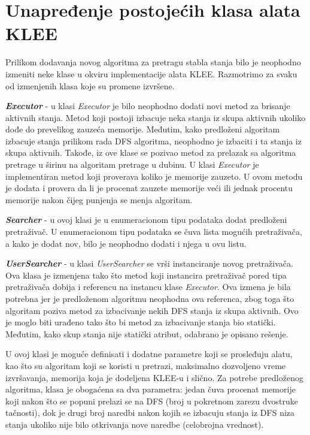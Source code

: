 \documentclass[12pt,oneside]{memoir}
\begin{document}
\section{Unapređenje postojećih klasa alata KLEE} \label{izmene}
Prilikom dodavanja novog algoritma za pretragu stabla stanja bilo je neophodno izmeniti neke klase u okviru implementacije alata KLEE. Razmotrimo za svaku od izmenjenih klasa koje su promene izvršene.

\begin{description}
    \item \textbf{\textit{Executor}} - u klasi \textit{Executor} je bilo neophodno dodati novi metod za brisanje aktivnih stanja. Metod koji postoji izbacuje neka stanja iz skupa aktivnih ukoliko dođe do prevelikog zauzeća memorije. Međutim, kako predloženi algoritam izbacuje stanja prilikom rada DFS algoritma, neophodno je izbaciti i ta stanja iz skupa aktivnih. Takođe, iz ove klase se pozivao metod za prelazak sa algoritma pretrage u širinu na algoritam pretrage u dubinu. U klasi \textit{Executor} je implementiran metod koji proverava koliko je memorije zauzeto. U ovom metodu je dodata i provera da li je procenat zauzete memorije veći ili jednak procentu memorije nakon čijeg punjenja se menja algoritam.
    
    \item \textbf{\textit{Searcher}} - u ovoj klasi je u enumeracionom tipu podataka dodat predloženi pretraživač. U enumeracionom tipu podataka se čuva lista mogućih pretraživača, a kako je dodat nov, bilo je neophodno dodati i njega u ovu listu.
    
    \item \textbf{\textit{UserSearcher}} \label{userSearcher} - u klasi \textit{UserSearcher} se vrši instanciranje novog pretraživača. Ova klasa je izmenjena tako što metod koji instancira pretraživač pored tipa pretraživača dobija i referencu na instancu klase \textit{Executor}. Ova izmena je bila potrebna jer je predloženom algoritmu neophodna ova referenca, zbog toga što algoritam poziva metod za izbacivanje nekih DFS stanja iz skupa aktivnih. Ovo je moglo biti urađeno tako što bi metod za izbacivanje stanja bio statički. Međutim, kako skup stanja nije statički atribut, odabrano je opisano rešenje. 
    
    U ovoj klasi je moguće definisati i dodatne parametre koji se prosleđuju alatu, kao što su algoritam koji se koristi u pretrazi, maksimalno dozvoljeno vreme izvršavanja, memorija koja je dodeljena KLEE-u i slično. Za potrebe predloženog algoritma, klasa je obogaćena sa dva parametra: jedan čuva procenat memorije koji nakon što se popuni prelazi se na DFS (broj u pokretnom zarezu dvostruke tačnosti), dok je drugi broj naredbi nakon kojih se izbacuju stanja iz DFS niza stanja ukoliko nije bilo otkrivanja nove naredbe (celobrojna vrednost).
\end{description}
\end{document}
